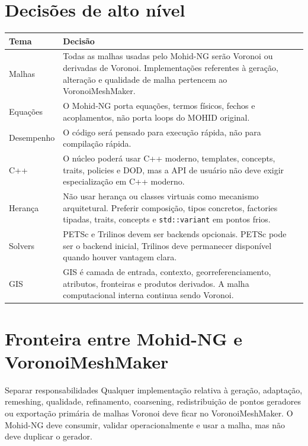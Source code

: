 \documentclass[11pt,a4paper]{article}
\begin{document}
\section{Decis\~oes de alto n\'ivel}

\begin{longtable}{p{}p{}}
\toprule
\textbf{Tema} & \textbf{Decis\~ao}\tabularnewline
\midrule
Malhas & Todas as malhas usadas pelo Mohid-NG ser\~ao Voronoi ou derivadas de Voronoi. Implementa\c{c}\~oes referentes \`a gera\c{c}\~ao, altera\c{c}\~ao e qualidade de malha pertencem ao VoronoiMeshMaker.\tabularnewline
\addlinespace
Equa\c{c}\~oes & O Mohid-NG porta equa\c{c}\~oes, termos f\'isicos, fechos e acoplamentos, n\~ao porta loops do MOHID original.\tabularnewline
\addlinespace
Desempenho & O c\'odigo ser\'a pensado para execu\c{c}\~ao r\'apida, n\~ao para compila\c{c}\~ao r\'apida.\tabularnewline
\addlinespace
C++ & O n\'ucleo poder\'a usar C++ moderno, templates, concepts, traits, policies e DOD, mas a API de usu\'ario n\~ao deve exigir especializa\c{c}\~ao em C++ moderno.\tabularnewline
\addlinespace
Heran\c{c}a & N\~ao usar heran\c{c}a ou classes virtuais como mecanismo arquitetural. Preferir composi\c{c}\~ao, tipos concretos, factories tipadas, traits, concepts e \texttt{std::variant} em pontos frios.\tabularnewline
\addlinespace
Solvers & PETSc e Trilinos devem ser backends opcionais. PETSc pode ser o backend inicial, Trilinos deve permanecer dispon\'ivel quando houver vantagem clara.\tabularnewline
\addlinespace
GIS & GIS \'e camada de entrada, contexto, georreferenciamento, atributos, fronteiras e produtos derivados. A malha computacional interna continua sendo Voronoi.\tabularnewline
\bottomrule
\end{longtable}

\section{Fronteira entre Mohid-NG e VoronoiMeshMaker}

\begin{decisionbox}{Separar responsabilidades}
Qualquer implementa\c{c}\~ao relativa \`a gera\c{c}\~ao, adapta\c{c}\~ao, remeshing, qualidade, refinamento, coarsening, redistribui\c{c}\~ao de pontos geradores ou exporta\c{c}\~ao prim\'aria de malhas Voronoi deve ficar no VoronoiMeshMaker. O Mohid-NG deve consumir, validar operacionalmente e usar a malha, mas n\~ao deve duplicar o gerador.
\end{decisionbox}
\end{document}
